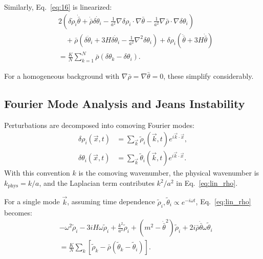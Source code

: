 Similarly, Eq.~\eqref{eq:16} is linearized:
\begin{align}
&2\left(\delta\dot{\rho}_i\dot{\bar{\theta}} + \dot{\bar{\rho}}\delta\dot{\theta}_i - \frac{1}{a^2}\nabla\delta\rho_i\cdot\nabla\bar{\theta} - \frac{1}{a^2}\nabla\bar{\rho}\cdot\nabla\delta\theta_i\right) \nonumber \\
&\quad + \bar{\rho}\left(\delta\ddot{\theta}_i + 3H\delta\dot{\theta}_i - \frac{1}{a^2}\nabla^2\delta\theta_i\right) + \delta\rho_i(\ddot{\bar{\theta}} + 3H\dot{\bar{\theta}}) \nonumber \\
&= \frac{K}{N}\sum_{k=1}^N \bar{\rho}(\delta\theta_k - \delta\theta_i).
\label{eq:lin_theta}
\end{align}

For a homogeneous background with $\nabla\bar{\rho} = \nabla\bar{\theta} = 0$, these simplify considerably.

\subsection{Fourier Mode Analysis and Jeans Instability}

Perturbations are decomposed into comoving Fourier modes:
\begin{equation}
\begin{aligned}
\delta\rho_i(\vec{x},t) &= \sum_{\vec{k}} \tilde{\rho}_i(\vec{k},t) e^{i\vec{k}\cdot\vec{x}}, \\
\delta\theta_i(\vec{x},t) &= \sum_{\vec{k}} \tilde{\theta}_i(\vec{k},t) e^{i\vec{k}\cdot\vec{x}}.
\end{aligned}
\end{equation}
With this convention $k$ is the comoving wavenumber, the physical wavenumber is $k_{\mathrm{phys}}=k/a$, and the Laplacian term contributes $k^2/a^2$ in Eq.~\eqref{eq:lin_rho}.

For a single mode $\vec{k}$, assuming time dependence $\tilde{\rho}_i, \tilde{\theta}_i \propto e^{-i\omega t}$, Eq.~\eqref{eq:lin_rho} becomes:
\begin{equation}
\begin{aligned}
&-\omega^2\tilde{\rho}_i - 3iH\omega\tilde{\rho}_i + \frac{k^2}{a^2}\tilde{\rho}_i
+ (m^2 - \dot{\bar{\theta}}^2)\tilde{\rho}_i + 2i\bar{\rho}\dot{\bar{\theta}}\omega\tilde{\theta}_i \\
&= \frac{K}{N}\sum_k \left[\tilde{\rho}_k - \bar{\rho}(\tilde{\theta}_k - \tilde{\theta}_i)\right].
\end{aligned}
\end{equation}

